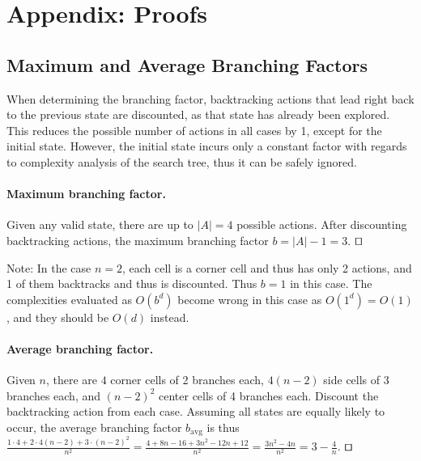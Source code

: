 \documentclass[runningheads]{llncs}
\begin{document}
\pagebreak
\appendix
\section{Appendix: Proofs}
\label{app:proofs}


\subsection{Maximum and Average Branching Factors}
When determining the branching factor, backtracking actions that lead right back to the previous state are discounted, as that state has already been explored. This reduces the possible number of actions in all cases by 1, except for the initial state. However, the initial state incurs only a constant factor with regards to complexity analysis of the search tree, thus it can be safely ignored.

\label{subsec:branchingfactors}
\paragraph{Maximum branching factor.} Given any valid state, there are up to $|A|=4$ possible actions. After discounting backtracking actions, the maximum branching factor $b = |A|-1 = 3$. $\qed$

Note: In the case $n=2$, each cell is a corner cell and thus has only 2 actions, and 1 of them backtracks and thus is discounted. Thus $b = 1$ in this case. The complexities evaluated as $O(b^d)$ become wrong in this case as $O(1^d) = O(1)$, and they should be $O(d)$ instead.

\paragraph{Average branching factor.} Given $n$, there are $4$ corner cells of 2 branches each, $4(n-2)$ side cells of 3 branches each, and $(n-2)^2$ center cells of 4 branches each. Discount the backtracking action from each case. Assuming all states are equally likely to occur, the average branching factor $b_\text{avg}$ is thus $\frac{1\cdot 4 + 2\cdot 4(n-2) + 3\cdot (n-2)^2}{n^2} = \frac{4 + 8n - 16 + 3n^2 - 12n + 12}{n^2} = \frac{3n^2 - 4n}{n^2} = 3 - \frac{4}{n}$. $\qed$
\end{document}
